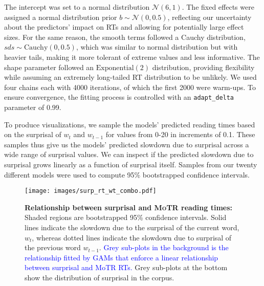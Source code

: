 \documentclass[12pt]{article}
\newcommand{\motr}{\textsc{MoTR}\xspace}
\newcommand{\change}[1]{\textcolor{blue}{#1}}
\begin{document}
{The intercept was set to a normal distribution \( \mathcal{N}(6, 1)\). The fixed effects were assigned a normal distribution prior \(b \sim \mathcal{N}(0, 0.5)\), reflecting our uncertainty about the predictors' impact on RTs and allowing for potentially large effect sizes. For the same reason, the smooth terms followed a Cauchy distribution, \(sds \sim \text{{Cauchy}}(0, 0.5)\), which was similar to normal distribution but with heavier tails, making it more tolerant of extreme values and less informative. The shape parameter followed an \(\text{{Exponential}}(2)\) distribution, providing flexibility while assuming an extremely long-tailed RT distribution to be unlikely. We used four chains each with 4000 iterations, of which the first 2000 were warm-ups. To ensure convergence, the fitting process is controlled with an \texttt{adapt\_delta} parameter of 0.99.

To produce visualizations, we sample the models' predicted reading times based on the surprisal of $w_t$ and $w_{t-1}$ for values from 0-20 in increments of 0.1. These samples thus give us the models' predicted slowdown due to surprisal across a wide range of surprisal values. We can inspect if the predicted slowdown due to surprisal grows linearly as a function of surprisal itself. Samples from our twenty different models were used to compute 95\% bootstrapped confidence intervals.

\begin{figure*}[t]
    \centering
    \begin{minipage}{0.98\textwidth}
    \centering
    \small
    \texttt{[image: images/surp\_rt\_wt\_combo.pdf]}
    \vspace{-0.3cm}
    \caption{ \small \textbf{Relationship between surprisal and \motr reading times:} Shaded regions are bootstrapped 95\% confidence intervals. Solid lines indicate the slowdown due to the surprisal of the current word, $w_t$, whereas dotted lines indicate the slowdown due to surprisal of the previous word $w_{t-1}$. \change{Grey sub-plots in the background is the relationship fitted by GAMs that enforce a linear relationship between surprisal and MoTR RTs.} Grey sub-plots at the bottom show the distribution of surprisal in the corpus. }
    \label{fig:surp_motr_link}
    \end{minipage}
\end{figure*}


}
\end{document}
